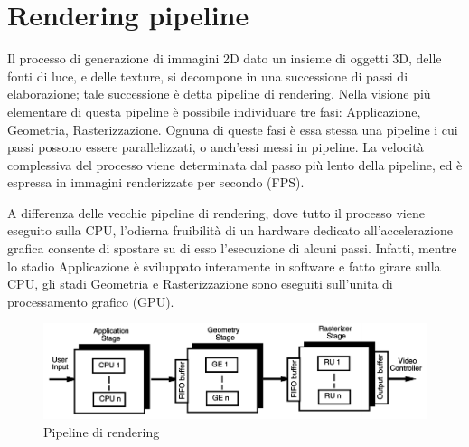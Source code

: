 \section{Rendering pipeline}
\label{sec:chapter_stato_arte_rendering_pipeline}

Il processo di generazione di immagini 2D dato un insieme di oggetti 3D, delle fonti di luce, e delle texture, si decompone in una successione di passi di elaborazione; tale successione è detta pipeline di rendering. Nella visione più elementare di questa pipeline è possibile individuare tre fasi: Applicazione, Geometria, Rasterizzazione.
Ognuna di queste fasi è essa stessa una pipeline i cui passi possono essere parallelizzati, o anch’essi messi in pipeline. La velocità complessiva del processo viene determinata dal passo più lento della pipeline, ed è espressa in immagini renderizzate per secondo (FPS).

A differenza delle vecchie pipeline di rendering, dove tutto il processo viene eseguito sulla CPU, l’odierna fruibilità di un hardware dedicato all’accelerazione grafica consente di spostare su di esso l’esecuzione di alcuni passi. Infatti, mentre lo stadio Applicazione è sviluppato interamente in software e fatto girare sulla CPU, gli stadi Geometria e Rasterizzazione sono eseguiti sull’unita di processamento grafico (GPU).
\\
\begin{figure}[htb]
 \centering
 \includegraphics[width=1.0\linewidth]{images/chapter_stato_arte/stato_arte_pipeline.png}\hfill
 \caption[Pipeline di rendering]{Pipeline di rendering}
 \label{fig:stato_arte_pipeline}
\end{figure}


